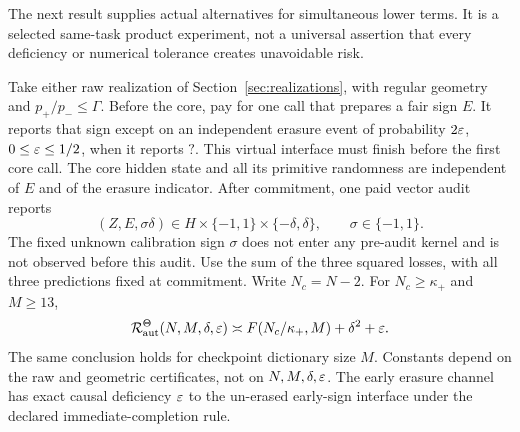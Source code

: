 The next result supplies actual alternatives for simultaneous lower terms. It is a selected same-task product experiment, not a universal assertion that every deficiency or numerical tolerance creates unavoidable risk.

\begin{theorem}\label{thm:joint}
Take either raw realization of Section~\ref{sec:realizations}, with regular geometry and $p_+/p_-\le\Gamma$. Before the core, pay for one call that prepares a fair sign $E$. It reports that sign except on an independent erasure event of probability $2\varepsilon$, $0\le\varepsilon\le1/2$, when it reports $\mathtt{?}$. This virtual interface must finish before the first core call. The core hidden state and all its primitive randomness are independent of $E$ and of the erasure indicator. After commitment, one paid vector audit reports
\[
 (Z,E,\sigma\delta)\in H\times\{-1,1\}\times\{-\delta,\delta\},
 \qquad \sigma\in\{-1,1\}.
\]
The fixed unknown calibration sign $\sigma$ does not enter any pre-audit kernel and is not observed before this audit. Use the sum of the three squared losses, with all three predictions fixed at commitment. Write $N_c=N-2$. For $N_c\ge\kappa_+$ and $M\ge13$,
\begin{equation}\label{eq:joint-law}
 \mathcal R_{\mathrm{aut}}^\Theta(N,M,\delta,\varepsilon)
 \asymp F(N_c/\kappa_+,M)+\delta^2+\varepsilon.
\end{equation}
The same conclusion holds for checkpoint dictionary size $M$. Constants depend on the raw and geometric certificates, not on $N,M,\delta,\varepsilon$. The early erasure channel has exact causal deficiency $\varepsilon$ to the un-erased early-sign interface under the declared immediate-completion rule.
\end{theorem}
